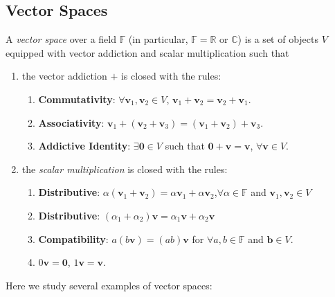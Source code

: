 \subsection{Vector Spaces}
\begin{definition}
A \emph{vector space} over a field $\mathbb{F}$ (in particular, $\mathbb{F}=\mathbb{R}$ or $\mathbb{C}$) is a set of objects $V$ equipped with vector addiction and scalar multiplication such that 
\begin{enumerate}
\item
the vector addiction $+$ is closed with the rules:
\begin{enumerate}
\item
\textbf{Commutativity}: $\forall\bm v_1,\bm v_2\in V$, $\bm v_1+\bm v_2=\bm v_2+\bm v_1$.
\item
\textbf{Associativity}: 
$\bm v_1+(\bm v_2+\bm v_3)=(\bm v_1+\bm v_2)+\bm v_3$.
\item
\textbf{Addictive Identity}: $\exists\bm0\in V$ such that $\bm0+\bm v=\bm v$, $\forall\bm v\in V$.
\end{enumerate}
\item
the \emph{scalar multiplication} is closed with the rules:
\begin{enumerate}
\item
\textbf{Distributive}:
$\alpha(\bm v_1+\bm v_2) = \alpha\bm v_1+\alpha\bm v_2$,$\forall\alpha\in\mathbb{F}$ and $\bm v_1,\bm v_2\in V$
\item
\textbf{Distributive}:
$(\alpha_1+\alpha_2)\bm v=\alpha_1\bm v+\alpha_2\bm v$
\item
\textbf{Compatibility}:
$a(b\bm v) = (ab)\bm v$ for $\forall a,b\in\mathbb{F}$ and $\bm b\in V$.
\item
$0\bm v=\bm0$, $1\bm v=\bm v$.
\end{enumerate}
\end{enumerate}
\end{definition}
Here we study several examples of vector spaces:
